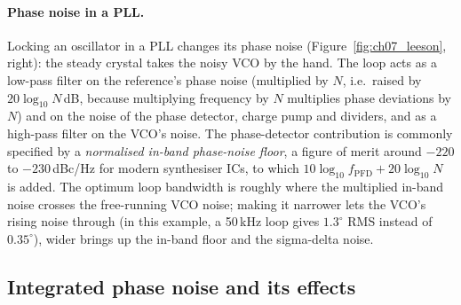 \paragraph{Phase noise in a PLL.} Locking an oscillator in a PLL changes its phase noise
(Figure~\ref{fig:ch07_leeson}, right): the steady crystal takes the noisy VCO by the hand. The loop acts
as a low-pass filter on the reference's phase noise (multiplied by $N$, i.e.\ raised by $20\log_{10}N$\,dB,
because multiplying frequency by $N$ multiplies phase deviations by $N$) and on the noise of the phase
detector, charge pump and dividers, and as a high-pass filter on the VCO's noise. The phase-detector
contribution is commonly specified by a \emph{normalised in-band phase-noise floor}, a figure of merit
around $-220$ to $-230$\,dBc/Hz for modern synthesiser ICs, to which $10\log_{10}f_{\text{PFD}}+20\log_{10}N$
is added. The optimum loop bandwidth is roughly where the multiplied in-band noise crosses the
free-running VCO noise; making it narrower lets the VCO's rising noise through (in this example, a
50\,kHz loop gives $1.3^\circ$ RMS instead of $0.35^\circ$), wider brings up the in-band floor and the
sigma-delta noise.


\subsection{Integrated phase noise and its effects}

